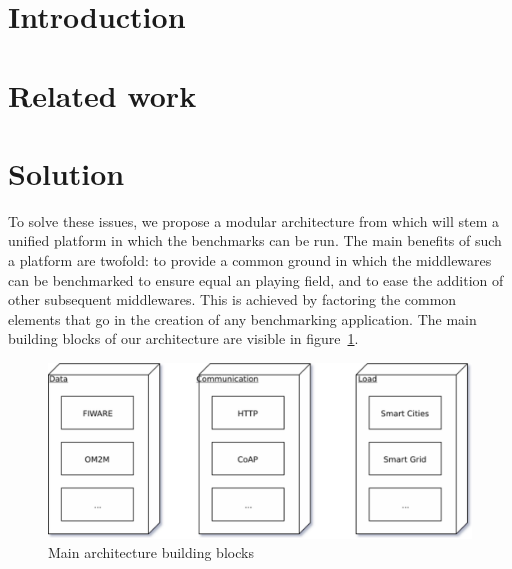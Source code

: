 \documentclass[conference]{IEEEtran}
\begin{document}
\title{}


\author{}


\maketitle

\begin{abstract}
\end{abstract}

\section{Introduction}


\section{Related work}


\section{Solution}

To solve these issues, we propose a modular architecture from which will stem a unified platform in which the benchmarks can be run. The main benefits of such a platform are twofold: to provide a common ground in which the middlewares can be benchmarked to ensure equal an playing field, and to ease the addition of other subsequent middlewares. This is achieved by factoring the common elements that go in the creation of any benchmarking application. The main building blocks of our architecture are visible in figure~\ref{fig:main_building_blocks}.

\begin{figure}[htbp!]
  \centering
  \includegraphics[width=\linewidth]{figures/benchmark_blocks.eps}
  \caption{Main architecture building blocks}
  \label{fig:main_building_blocks}
\end{figure}
\end{document}
